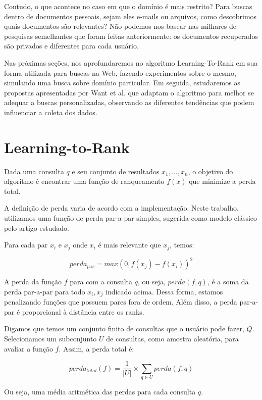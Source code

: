 \documentclass{svproc}
\begin{document}
Contudo, o que acontece no caso em que o domínio é mais restrito? Para buscas dentro de documentos pessoais, sejam eles
e-mails ou arquivos, como descobrimos quais documentos são relevantes? Não podemos nos basear nas milhares de pesquisas
semelhantes que foram feitas anteriormente: os documentos recuperados são privados e diferentes para cada usuário.

Nas próximas seções, nos aprofundaremos no algoritmo Learning-To-Rank em sua forma utilizada para buscas na Web, fazendo 
experimentos sobre o mesmo, simulando uma busca sobre domínio particular. Em seguida, estudaremos as propostas apresentadas 
por Want et al. \cite{wang:bendersky:metzlet:najork} que adaptam o algoritmo para melhor se adequar a buscas personalizadas,
observando as diferentes tendências que podem influenciar a coleta dos dados.


\section{Learning-to-Rank}
Dada uma consulta $q$ e seu conjunto de resultados ${x_1,\dots,x_n}$, o objetivo do algoritmo
é encontrar uma função de ranqueamento $f(x)$ que minimize a perda total.

A definição de perda varia de acordo com a implementação. Neste trabalho, utilizamos uma função de perda par-a-par
simples, sugerida como modelo clássico pelo artigo estudado.

Para cada par $x_i$ e $x_j$ onde $x_i$ é mais relevante que $x_j$, temos:

\begin{equation}
perda_{par} = max(0, f(x_j) - f(x_i))^2
\end{equation}

A perda da função $f$ para com a consulta $q$, ou seja, $perda(f, q)$, é a soma da perda par-a-par para todo 
$x_i, x_j$ indicado acima. Dessa forma, estamos penalizando funções que possuem pares fora de ordem.
Além disso, a perda par-a-par é proporcional à distância entre os ranks.

Digamos que temos um conjunto finito de consultas que o usuário pode fazer, $Q$. 
Selecionamos um subconjunto $U$ de consultas, como amostra aleatória, para avaliar a função $f$.
Assim, a perda total é:

\begin{equation}
perda_{total}(f) = \frac{1}{|U|}\times \sum_{q \in U} perda(f, q)
\end{equation}

Ou seja, uma média aritmética das perdas para cada consulta $q$.
\end{document}

